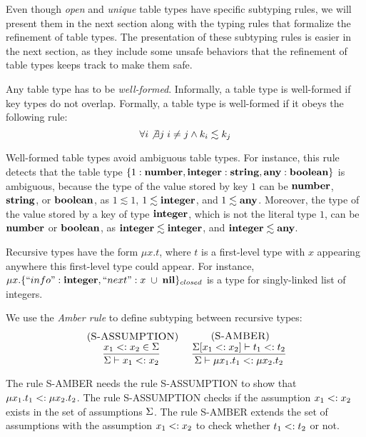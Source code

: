 Even though \emph{open} and \emph{unique} table types have specific
subtyping rules, we will present them in the next section along with
the typing rules that formalize the refinement of table types.
The presentation of these subtyping rules is easier in the next section,
as they include some unsafe behaviors that the refinement of
table types keeps track to make them safe.

Any table type has to be \emph{well-formed}.
Informally, a table type is well-formed if key types do not overlap.
Formally, a table type is well-formed if it obeys the following rule:
\[
\forall i \not\exists j \; i \not= j \wedge k_{i} \lesssim k_{j}
\]

Well-formed table types avoid ambiguous table types.
For instance, this rule detects that the table type
$\{1:\mathbf{number}, \mathbf{integer}:\mathbf{string}, \mathbf{any}:\mathbf{boolean}\}$ is ambiguous,
because the type of the value stored by key $1$ can be
$\mathbf{number}$, $\mathbf{string}$, or $\mathbf{boolean}$, as $1 \lesssim 1$,
$1 \lesssim \mathbf{integer}$, and $1 \lesssim \mathbf{any}$.
Moreover, the type of the value stored by a key of type $\mathbf{integer}$,
which is not the literal type $1$, can be $\mathbf{number}$ or $\mathbf{boolean}$,
as $\mathbf{integer} \lesssim \mathbf{integer}$, and $\mathbf{integer} \lesssim \mathbf{any}$.

Recursive types have the form $\mu x.t$,
where $t$ is a first-level type with $x$ appearing anywhere this
first-level type could appear.
For instance, $\mu x.\{``info":\mathbf{integer}, ``next":x \;\cup\; \mathbf{nil}\}_{closed}$
is a type for singly-linked list of integers.

We use the \emph{Amber rule} \citep{cardelli1986amber} to define
subtyping between recursive types:
\[
\begin{array}{c}
\begin{array}{c}
\; (\textsc{S-ASSUMPTION})\\
\dfrac{x_{1} <: x_{2} \in \Sigma}
      {\Sigma \vdash x_{1} <: x_{2}}
\end{array}
\;
\begin{array}{c}
\; (\textsc{S-AMBER})\\
\dfrac{\Sigma[x_{1} <: x_{2}] \vdash t_{1} <: t_{2}}
      {\Sigma \vdash \mu x_{1}.t_{1} <: \mu x_{2}.t_{2}}
\end{array}
\end{array}
\]

The rule \textsc{S-AMBER} needs the rule \textsc{S-ASSUMPTION}
to show that $\mu x_{1}.t_{1} <: \mu x_{2}.t_{2}$.
The rule \textsc{S-ASSUMPTION} checks if the assumption
$x_{1} <: x_{2}$ exists in the set of assumptions $\Sigma$.
The rule \textsc{S-AMBER} extends the set of assumptions
with the assumption $x_{1} <: x_{2}$ to check whether
$t_{1} <: t_{2}$ or not.


